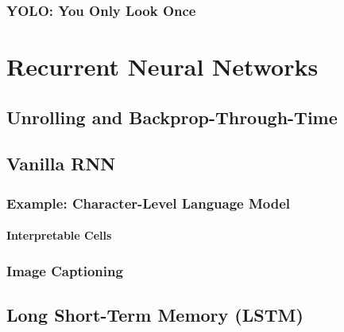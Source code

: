 		\subsection{YOLO: You Only Look Once} %

\chapter{Recurrent Neural Networks} %

	\section{Unrolling and Backprop-Through-Time} %

	\section{Vanilla RNN} %

		\subsection{Example: Character-Level Language Model} %

			\subsubsection{Interpretable Cells} %

		\subsection{Image Captioning} %

	\section{Long Short-Term Memory (LSTM)} %

